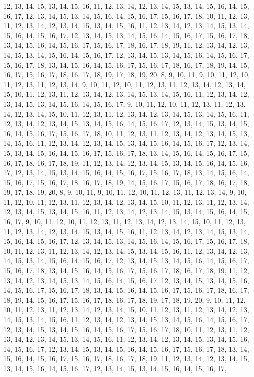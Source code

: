 12, 13, 14, 15, 13, 14, 15, 16, 11, 12, 13, 14, 12, 13, 14, 15, 13, 14, 15, 16, 14, 15, 16, 17, 12, 13, 14, 15, 13, 14, 15, 16, 14, 15, 16, 17, 15, 16, 17, 18, 10, 11, 12, 13, 11, 12, 13, 14, 12, 13, 14, 15, 13, 14, 15, 16, 11, 12, 13, 14, 12, 13, 14, 15, 13, 14, 15, 16, 14, 15, 16, 17, 12, 13, 14, 15, 13, 14, 15, 16, 14, 15, 16, 17, 15, 16, 17, 18, 13, 14, 15, 16, 14, 15, 16, 17, 15, 16, 17, 18, 16, 17, 18, 19, 11, 12, 13, 14, 12, 13, 14, 15, 13, 14, 15, 16, 14, 15, 16, 17, 12, 13, 14, 15, 13, 14, 15, 16, 14, 15, 16, 17, 15, 16, 17, 18, 13, 14, 15, 16, 14, 15, 16, 17, 15, 16, 17, 18, 16, 17, 18, 19, 14, 15, 16, 17, 15, 16, 17, 18, 16, 17, 18, 19, 17, 18, 19, 20, 8, 9, 10, 11, 9, 10, 11, 12, 10, 11, 12, 13, 11, 12, 13, 14, 9, 10, 11, 12, 10, 11, 12, 13, 11, 12, 13, 14, 12, 13, 14, 15, 10, 11, 12, 13, 11, 12, 13, 14, 12, 13, 14, 15, 13, 14, 15, 16, 11, 12, 13, 14, 12, 13, 14, 15, 13, 14, 15, 16, 14, 15, 16, 17, 9, 10, 11, 12, 10, 11, 12, 13, 11, 12, 13, 14, 12, 13, 14, 15, 10, 11, 12, 13, 11, 12, 13, 14, 12, 13, 14, 15, 13, 14, 15, 16, 11, 12, 13, 14, 12, 13, 14, 15, 13, 14, 15, 16, 14, 15, 16, 17, 12, 13, 14, 15, 13, 14, 15, 16, 14, 15, 16, 17, 15, 16, 17, 18, 10, 11, 12, 13, 11, 12, 13, 14, 12, 13, 14, 15, 13, 14, 15, 16, 11, 12, 13, 14, 12, 13, 14, 15, 13, 14, 15, 16, 14, 15, 16, 17, 12, 13, 14, 15, 13, 14, 15, 16, 14, 15, 16, 17, 15, 16, 17, 18, 13, 14, 15, 16, 14, 15, 16, 17, 15, 16, 17, 18, 16, 17, 18, 19, 11, 12, 13, 14, 12, 13, 14, 15, 13, 14, 15, 16, 14, 15, 16, 17, 12, 13, 14, 15, 13, 14, 15, 16, 14, 15, 16, 17, 15, 16, 17, 18, 13, 14, 15, 16, 14, 15, 16, 17, 15, 16, 17, 18, 16, 17, 18, 19, 14, 15, 16, 17, 15, 16, 17, 18, 16, 17, 18, 19, 17, 18, 19, 20, 8, 9, 10, 11, 9, 10, 11, 12, 10, 11, 12, 13, 11, 12, 13, 14, 9, 10, 11, 12, 10, 11, 12, 13, 11, 12, 13, 14, 12, 13, 14, 15, 10, 11, 12, 13, 11, 12, 13, 14, 12, 13, 14, 15, 13, 14, 15, 16, 11, 12, 13, 14, 12, 13, 14, 15, 13, 14, 15, 16, 14, 15, 16, 17, 9, 10, 11, 12, 10, 11, 12, 13, 11, 12, 13, 14, 12, 13, 14, 15, 10, 11, 12, 13, 11, 12, 13, 14, 12, 13, 14, 15, 13, 14, 15, 16, 11, 12, 13, 14, 12, 13, 14, 15, 13, 14, 15, 16, 14, 15, 16, 17, 12, 13, 14, 15, 13, 14, 15, 16, 14, 15, 16, 17, 15, 16, 17, 18, 10, 11, 12, 13, 11, 12, 13, 14, 12, 13, 14, 15, 13, 14, 15, 16, 11, 12, 13, 14, 12, 13, 14, 15, 13, 14, 15, 16, 14, 15, 16, 17, 12, 13, 14, 15, 13, 14, 15, 16, 14, 15, 16, 17, 15, 16, 17, 18, 13, 14, 15, 16, 14, 15, 16, 17, 15, 16, 17, 18, 16, 17, 18, 19, 11, 12, 13, 14, 12, 13, 14, 15, 13, 14, 15, 16, 14, 15, 16, 17, 12, 13, 14, 15, 13, 14, 15, 16, 14, 15, 16, 17, 15, 16, 17, 18, 13, 14, 15, 16, 14, 15, 16, 17, 15, 16, 17, 18, 16, 17, 18, 19, 14, 15, 16, 17, 15, 16, 17, 18, 16, 17, 18, 19, 17, 18, 19, 20, 9, 10, 11, 12, 10, 11, 12, 13, 11, 12, 13, 14, 12, 13, 14, 15, 10, 11, 12, 13, 11, 12, 13, 14, 12, 13, 14, 15, 13, 14, 15, 16, 11, 12, 13, 14, 12, 13, 14, 15, 13, 14, 15, 16, 14, 15, 16, 17, 12, 13, 14, 15, 13, 14, 15, 16, 14, 15, 16, 17, 15, 16, 17, 18, 10, 11, 12, 13, 11, 12, 13, 14, 12, 13, 14, 15, 13, 14, 15, 16, 11, 12, 13, 14, 12, 13, 14, 15, 13, 14, 15, 16, 14, 15, 16, 17, 12, 13, 14, 15, 13, 14, 15, 16, 14, 15, 16, 17, 15, 16, 17, 18, 13, 14, 15, 16, 14, 15, 16, 17, 15, 16, 17, 18, 16, 17, 18, 19, 11, 12, 13, 14, 12, 13, 14, 15, 13, 14, 15, 16, 14, 15, 16, 17, 12, 13, 14, 15, 13, 14, 15, 16, 14, 15, 16, 17, 